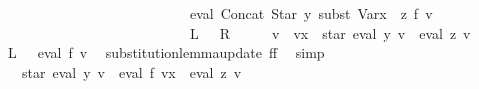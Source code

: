 \begin{isabellebody}
\ \ \ \ \ \ \ \ \ \ \ \ \ \ \ \ \ \ \ \ \ \ \ \ \ \ {\isasymsubseteq}\ {\isasymPsi}\ {\isacharparenleft}{\kern0pt}eval\ {\isacharparenleft}{\kern0pt}Concat\ {\isacharparenleft}{\kern0pt}Star\ y{\isacharparenright}{\kern0pt}\ {\isacharparenleft}{\kern0pt}subst\ {\isacharparenleft}{\kern0pt}Var{\isacharparenleft}{\kern0pt}x\ {\isacharcolon}{\kern0pt}{\isacharequal}{\kern0pt}\ z{\isacharparenright}{\kern0pt}{\isacharparenright}{\kern0pt}\ f{\isacharparenright}{\kern0pt}{\isacharparenright}{\kern0pt}\ v{\isacharparenright}{\kern0pt}{\isachardoublequoteclose}\isanewline
\ \ \ \ \ \ \ \ \ \ \ \ \ \ \ \ \ \ \ \ \ \ \ \ \ \ {\isacharparenleft}{\kern0pt}\ {\isachardoublequoteopen}{\isasymPsi}\ {\isacharquery}{\kern0pt}L\ {\isasymsubseteq}\ {\isasymPsi}\ {\isacharquery}{\kern0pt}R{\isachardoublequoteclose}{\isacharparenright}{\kern0pt}\isanewline
%
\isadelimproof
%
\endisadelimproof
%
\isatagproof
{}\isamarkupfalse%
\ {\isacharminus}{\kern0pt}\isanewline
\ \ \isamarkupfalse%
\ {\isacharquery}{\kern0pt}v{\isacharprime}{\kern0pt}\ {\isacharequal}{\kern0pt}\ {\isachardoublequoteopen}v{\isacharparenleft}{\kern0pt}x\ {\isacharcolon}{\kern0pt}{\isacharequal}{\kern0pt}\ star\ {\isacharparenleft}{\kern0pt}eval\ y\ v{\isacharparenright}{\kern0pt}\ {\isacharat}{\kern0pt}{\isacharat}{\kern0pt}\ eval\ z\ v{\isacharparenright}{\kern0pt}{\isachardoublequoteclose}\isanewline
\ \ \isamarkupfalse%
\ {\isachardoublequoteopen}{\isasymPsi}\ {\isacharquery}{\kern0pt}L\ {\isacharequal}{\kern0pt}\ {\isasymPsi}\ {\isacharparenleft}{\kern0pt}eval\ f\ {\isacharquery}{\kern0pt}v{\isacharprime}{\kern0pt}{\isacharparenright}{\kern0pt}{\isachardoublequoteclose}\ \isamarkupfalse%
\ substitution{\isacharunderscore}{\kern0pt}lemma{\isacharunderscore}{\kern0pt}update{\isacharbrackleft}{\kern0pt}\ f{\isacharequal}{\kern0pt}f{\isacharbrackright}{\kern0pt}\ \isamarkupfalse%
\ simp\isanewline
\ \ \isamarkupfalse%
\ \isamarkupfalse%
\ {\isachardoublequoteopen}{\isasymdots}\ {\isasymsubseteq}\ {\isasymPsi}\ {\isacharparenleft}{\kern0pt}star\ {\isacharparenleft}{\kern0pt}eval\ y\ v{\isacharparenright}{\kern0pt}\ {\isacharat}{\kern0pt}{\isacharat}{\kern0pt}\ eval\ f\ {\isacharparenleft}{\kern0pt}{\isacharquery}{\kern0pt}v{\isacharprime}{\kern0pt}{\isacharparenleft}{\kern0pt}x\ {\isacharcolon}{\kern0pt}{\isacharequal}{\kern0pt}\ eval\ z\ v{\isacharparenright}{\kern0pt}{\isacharparenright}{\kern0pt}{\isacharparenright}{\kern0pt}{\isachardoublequoteclose}\isanewline

\end{isabellebody}
